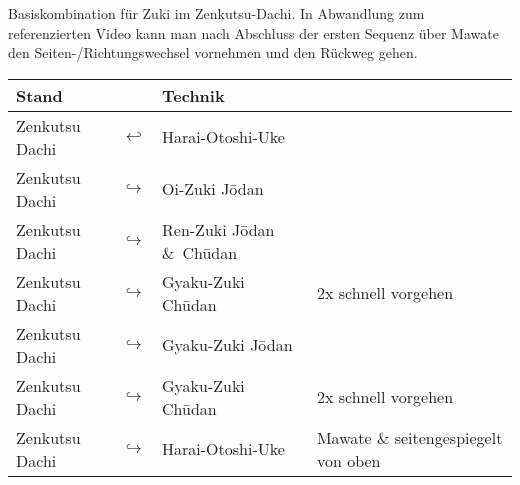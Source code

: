 \null\vfill\null
\begin{center}
	\parbox{\textwidth-2\tabcolsep}{Basiskombination für Zuki im Zenkutsu-Dachi. In Abwandlung zum referenzierten Video kann man nach Abschluss der ersten Sequenz über Mawate den Seiten-/Richtungswechsel vornehmen und den Rückweg gehen.}
\end{center}
\begin{tabularx}{\textwidth}{lllX}
	Stand	&&Technik	&\\
	\midrule
	Zenkutsu Dachi 	& \(\hookleftarrow\) & Harai-Otoshi-Uke	&\\
	Zenkutsu Dachi 	& \(\hookrightarrow\) & Oi-Zuki J\={o}dan	&\\
	Zenkutsu Dachi 	& \(\hookrightarrow\) & Ren-Zuki J\={o}dan \&~Ch\={u}dan	&\\
	Zenkutsu Dachi 	& \(\hookrightarrow\) & Gyaku-Zuki Ch\={u}dan	&2x schnell vorgehen\\
	Zenkutsu Dachi 	& \(\hookrightarrow\) & Gyaku-Zuki J\={o}dan	&\\
	Zenkutsu Dachi 	& \(\hookrightarrow\) & Gyaku-Zuki Ch\={u}dan	&2x schnell vorgehen\\
	Zenkutsu Dachi 	& \(\hookrightarrow\) & Harai-Otoshi-Uke	& Mawate \& seitengespiegelt von oben\\
	\midrule
\end{tabularx}\\\null\vfill\null